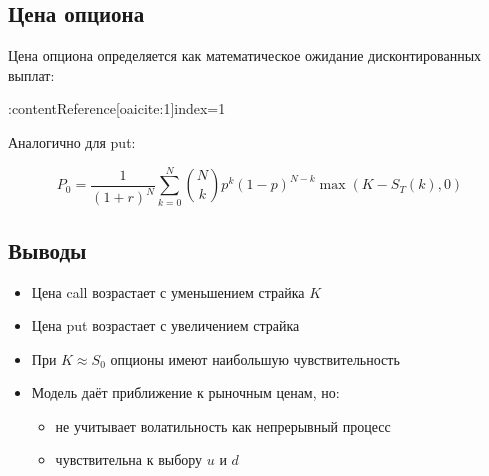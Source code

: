 \subsection*{Цена опциона}

Цена опциона определяется как математическое ожидание дисконтированных выплат:

:contentReference[oaicite:1]{index=1}

Аналогично для put:

\[
P_0 = \frac{1}{(1+r)^N} \sum_{k=0}^{N} \binom{N}{k} p^k (1-p)^{N-k} \max(K - S_T(k), 0)
\]

\subsection*{Выводы}

\begin{itemize}
    \item Цена call возрастает с уменьшением страйка $K$
    \item Цена put возрастает с увеличением страйка
    \item При $K \approx S_0$ опционы имеют наибольшую чувствительность
    \item Модель даёт приближение к рыночным ценам, но:
    \begin{itemize}
        \item не учитывает волатильность как непрерывный процесс
        \item чувствительна к выбору $u$ и $d$
    \end{itemize}
\end{itemize}
